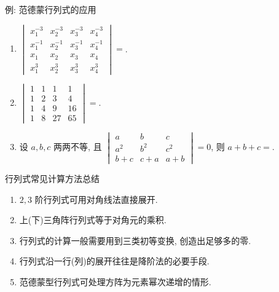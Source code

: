 \begin{frame}{例: 范德蒙行列式的应用}
	\onslide<+->
	\begin{exercise}
		\begin{enumerate}
			\item $\begin{vmatrix}
				x_1^{-3}&x_2^{-3}&x_3^{-3}&x_4^{-3}\\
				x_1^{-1}&x_2^{-1}&x_3^{-1}&x_4^{-1}\\
				x_1&x_2&x_3&x_4\\
				x_1^{3}&x_2^{3}&x_3^{3}&x_4^{3}
			\end{vmatrix}=$.
			\item $\begin{vmatrix}
				1&1&1&1\\
				1&2&3&4\\
				1&4&9&16\\
				1&8&27&65
			\end{vmatrix}=$.
			\item 设 $a,b,c$ 两两不等, 且 $\begin{vmatrix}
				a&b&c\\
				a^2&b^2&c^2\\
				b+c&c+a&a+b
			\end{vmatrix}=0$, 则 $a+b+c=$.
		\end{enumerate}
	\end{exercise}
\end{frame}


\begin{frame}{行列式常见计算方法总结}
	\begin{enumerate}
		\item $2,3$ 阶行列式可用对角线法直接展开.
		\item 上(下)三角阵行列式等于对角元的乘积.
		\item 行列式的计算一般需要用到\alert{三类初等变换}, 创造出足够多的零.
		\item 行列式沿一行(列)的展开往往是\alert{降阶法}的必要手段.
		\item 范德蒙型行列式可处理方阵为元素幂次递增的情形.
	\end{enumerate}
\end{frame}


